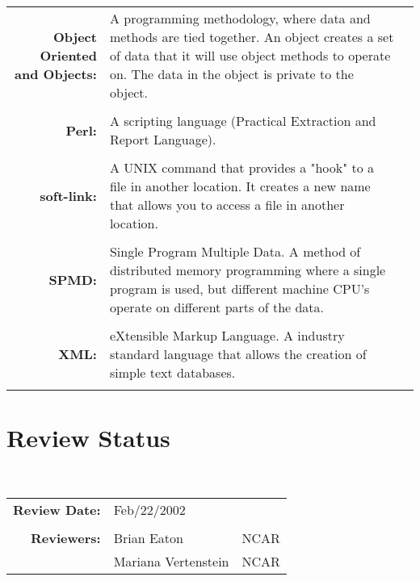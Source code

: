 \documentclass[]{article}
\begin{document}
\begin{tabular}{r p{3.3in} p{4in}}
{\bf Object Oriented and Objects:} & A programming methodology, where data and methods
are tied together. An object creates a set of data that it will use object methods to
operate on. The data in the object is private to the object. \\ \\

{\bf Perl:} & A scripting language (Practical Extraction and Report Language). \\ \\

{\bf soft-link:} & A UNIX command that provides a "hook" to a file in another location.
It creates a new name that allows you to access a file in another location. \\ \\

{\bf SPMD:} & Single Program Multiple Data. A method of distributed memory programming
where a single program is used, but different machine CPU's operate on different parts
of the data. \\ \\

{\bf XML:} & eXtensible Markup Language. A industry standard language that allows the
creation of simple text databases. \\ \\

\end{tabular}

\section{Review Status}

 \\

\begin{tabular}{r p{1.3in} p{2in}}
{\bf Review Date:} & Feb/22/2002 \\ \\
{\bf Reviewers:}   & Brian Eaton         & NCAR \\
                   & Mariana Vertenstein & NCAR
\end{tabular}
\end{document}
